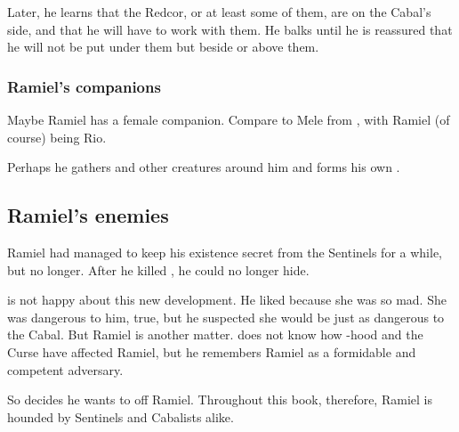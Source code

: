 Later, he learns that the Redcor, or at least some of them, are on the Cabal's side, and that he will have to work with them. He balks until he is reassured that he will not be put under them but beside or above them. 








\subsubsection{Ramiel's companions}
Maybe Ramiel has a female companion. 
Compare to Mele from \emph{\JuukenSentaiGekiranger}, with Ramiel (of course) being Rio. 

Perhaps he gathers \vorcanths{} and other creatures around him and forms his own \Rinjuuken. 









\subsection{Ramiel's enemies}
Ramiel had managed to keep his existence secret from the Sentinels for a while, but no longer. 
After he killed \Shiaraid, he could no longer hide. 

\Secherdamon{} is not happy about this new development. 
He liked \Shiaraid{} because she was so mad. 
She was dangerous to him, true, but he suspected she would be just as dangerous to the Cabal. 
But Ramiel is another matter. 
\Secherdamon{} does not know how \malach-hood and the Curse have affected Ramiel, but he remembers Ramiel as a formidable and competent adversary. 

So \Secherdamon{} decides he wants to off Ramiel. 
Throughout this book, therefore, Ramiel is hounded by Sentinels and Cabalists alike. 

